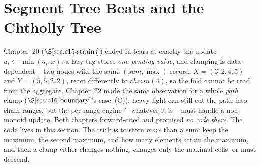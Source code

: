 \section{Segment Tree Beats and the Chtholly Tree}\label{sec:c29-beats}

\begin{previouslybox}
Chapter~20 (\(\secref{c15-strains}\)) ended in tears at exactly the update
\(a_i \leftarrow \min(a_i,x)\): a lazy tag stores \emph{one pending value}, and
clamping is data-dependent -- two nodes with the same \((\mathit{sum},\max)\)
record, \(X=(3,2,4,5)\) and \(Y=(5,5,2,2)\), react differently to
\(\mathit{chmin}(4)\), so the fold cannot be read from the aggregate.  Chapter~22
made the same observation for a whole \emph{path} clamp (\(\secref{c16-boundary}\)'s
case~(C)): heavy-light can still cut the path into chain ranges, but the
per-range engine \"-- whatever it is -- must handle a non-monoid update.  Both
chapters forward-cited  and promised \emph{no code there}.  The code
lives in this section.  The trick is to store \emph{more} than a sum: keep the
maximum, the second maximum, and how many elements attain the maximum, and then a
clamp either changes nothing, changes only the maximal cells, or must descend.
\end{previouslybox}

